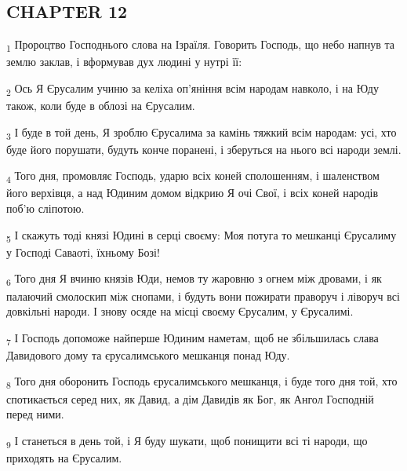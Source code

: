 \subsection{CHAPTER 12}
\begin{tcolorbox}
\textsubscript{1} Пророцтво Господнього слова на Ізраїля. Говорить Господь, що небо напнув та землю заклав, і вформував дух людині у нутрі її:
\end{tcolorbox}
\begin{tcolorbox}
\textsubscript{2} Ось Я Єрусалим учиню за келіха оп'яніння всім народам навколо, і на Юду також, коли буде в облозі на Єрусалим.
\end{tcolorbox}
\begin{tcolorbox}
\textsubscript{3} І буде в той день, Я зроблю Єрусалима за камінь тяжкий всім народам: усі, хто буде його порушати, будуть конче поранені, і зберуться на нього всі народи землі.
\end{tcolorbox}
\begin{tcolorbox}
\textsubscript{4} Того дня, промовляє Господь, ударю всіх коней сполошенням, і шаленством його верхівця, а над Юдиним домом відкрию Я очі Свої, і всіх коней народів поб'ю сліпотою.
\end{tcolorbox}
\begin{tcolorbox}
\textsubscript{5} І скажуть тоді князі Юдині в серці своєму: Моя потуга то мешканці Єрусалиму у Господі Саваоті, їхньому Бозі!
\end{tcolorbox}
\begin{tcolorbox}
\textsubscript{6} Того дня Я вчиню князів Юди, немов ту жаровню з огнем між дровами, і як палаючий смолоскип між снопами, і будуть вони пожирати праворуч і ліворуч всі довкільні народи. І знову осяде на місці своєму Єрусалим, у Єрусалимі.
\end{tcolorbox}
\begin{tcolorbox}
\textsubscript{7} І Господь допоможе найперше Юдиним наметам, щоб не збільшилась слава Давидового дому та єрусалимського мешканця понад Юду.
\end{tcolorbox}
\begin{tcolorbox}
\textsubscript{8} Того дня оборонить Господь єрусалимського мешканця, і буде того дня той, хто спотикається серед них, як Давид, а дім Давидів як Бог, як Ангол Господній перед ними.
\end{tcolorbox}
\begin{tcolorbox}
\textsubscript{9} І станеться в день той, і Я буду шукати, щоб понищити всі ті народи, що приходять на Єрусалим.
\end{tcolorbox}
